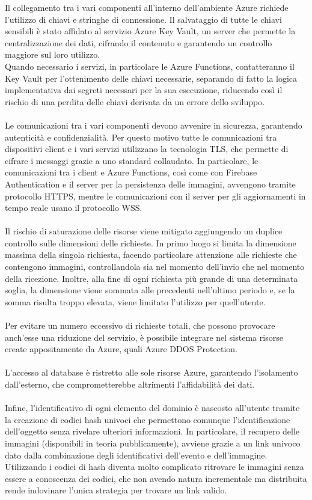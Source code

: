 Il collegamento tra i vari componenti all’interno dell’ambiente Azure 
richiede l’utilizzo di chiavi e stringhe di connessione. 
Il salvataggio di tutte le chiavi sensibili è stato affidato al servizio Azure Key Vault,
 un server che permette la centralizzazione dei dati, 
 cifrando il contenuto e garantendo un controllo maggiore sul loro utilizzo. \\
Quando necessario i servizi, in particolare le Azure Functions, 
contatteranno il Key Vault per l'ottenimento delle chiavi necessarie, 
separando di fatto la logica implementativa dai segreti necessari per la sua esecuzione,
riducendo così il rischio di una perdita delle chiavi derivata da un errore dello sviluppo.\\
\\
Le comunicazioni tra i vari componenti devono avvenire in sicurezza, 
garantendo autenticità e confidenzialità. 
Per questo motivo tutte le comunicazioni tra dispositivi client e 
i vari servizi utilizzano la tecnologia TLS, 
che permette di cifrare i messaggi grazie a uno standard collaudato. 
In particolare, le comunicazioni tra i client e Azure Functions, 
così come con Firebase Authentication e il server per la persistenza delle immagini, 
avvengono tramite protocollo HTTPS, 
mentre le comunicazioni con il server per gli aggiornamenti in tempo reale usano il protocollo WSS.\\
\\
Il rischio di saturazione delle risorse viene mitigato 
aggiungendo un duplice controllo sulle dimensioni delle richieste.
In primo luogo si limita la dimensione massima della singola richiesta, 
facendo particolare attenzione alle richieste che contengono immagini, 
controllandola sia nel momento dell'invio che nel momento della ricezione.
Inoltre, alla fine di ogni richiesta più grande di una determinata soglia,
la dimensione viene sommata alle precedenti nell'ultimo periodo e, 
se la somma risulta troppo elevata, viene limitato l'utilizzo per quell'utente.\\
\\
Per evitare un numero eccessivo di richieste totali, 
che possono provocare anch'esse una riduzione del servizio, 
è possibile integrare nel sistema risorse create appositamente da Azure, 
quali Azure DDOS Protection.\\
\\
L’accesso al database è ristretto alle sole risorse Azure, 
garantendo l’isolamento dall’esterno, 
che comprometterebbe altrimenti l’affidabilità dei dati.\\
\\
Infine, l’identificativo di ogni elemento del dominio è nascosto all’utente 
tramite la creazione di codici hash univoci 
che permettono comunque l'identificazione dell'oggetto senza rivelare ulteriori informazioni. 
In particolare, il recupero delle immagini (disponibili in teoria pubblicamente),
avviene grazie a un link univoco dato dalla combinazione degli identificativi dell'evento e dell'immagine. 
Utilizzando i codici di hash diventa molto complicato ritrovare le immagini 
senza essere a conoscenza dei codici, 
che non avendo natura incrementale ma distribuita rende 
indovinare l'unica strategia per trovare un link valido.


